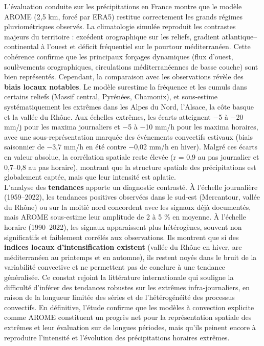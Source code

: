 \documentclass[
  article,
  nofooter,
  noheadings]{jss}
\begin{document}
L'évaluation conduite sur les précipitations en France montre que le
modèle AROME (2,5 km, forcé par ERA5) restitue correctement les grands
régimes pluviométriques observés. La climatologie simulée reproduit les
contrastes majeurs du territoire : excédent orographique sur les
reliefs, gradient atlantique--continental à l'ouest et déficit
fréquentiel sur le pourtour méditerranéen. Cette cohérence confirme que
les principaux forçages dynamiques (flux d'ouest, soulèvements
orographiques, circulations méditerranéennes de basse couche) sont bien
représentés. Cependant, la comparaison avec les observations révèle des
\textbf{biais locaux notables}. Le modèle surestime la fréquence et les
cumuls dans certains reliefs (Massif central, Pyrénées, Chamonix), et
sous-estime systématiquement les extrêmes dans les Alpes du Nord,
l'Alsace, la côte basque et la vallée du Rhône. Aux échelles extrêmes,
les écarts atteignent −5 à −20 mm/j pour les maxima journaliers et −5 à
−10 mm/h pour les maxima horaires, avec une sous-représentation marquée
des événements convectifs estivaux (biais saisonnier de −3,7 mm/h en été
contre −0,02 mm/h en hiver). Malgré ces écarts en valeur absolue, la
corrélation spatiale reste élevée (r = 0,9 au pas journalier et 0,7--0,8
au pas horaire), montrant que la structure spatiale des précipitations
est globalement captée, mais que leur intensité est aplatie.\\

L'analyse des \textbf{tendances} apporte un diagnostic contrasté. À
l'échelle journalière (1959--2022), les tendances positives observées
dans le sud-est (Mercantour, vallée du Rhône) ou sur la moitié nord
concordent avec les signaux déjà documentés, mais AROME sous-estime leur
amplitude de 2 à 5 \% en moyenne. À l'échelle horaire (1990--2022), les
signaux apparaissent plus hétérogènes, souvent non significatifs et
faiblement corrélés aux observations. Ils montrent que si des
\textbf{indices locaux d'intensification existent} (vallée du Rhône en
hiver, arc méditerranéen au printemps et en automne), ils restent noyés
dans le bruit de la variabilité convective et ne permettent pas de
conclure à une tendance généralisée. Ce constat rejoint la littérature
internationale qui souligne la difficulté d'inférer des tendances
robustes sur les extrêmes infra-journaliers, en raison de la longueur
limitée des séries et de l'hétérogénéité des processus convectifs. En
définitive, l'étude confirme que les modèles à convection explicite
comme AROME constituent un progrès net pour la représentation spatiale
des extrêmes et leur évaluation sur de longues périodes, mais qu'ils
peinent encore à reproduire l'intensité et l'évolution des
précipitations horaires extrêmes.
\end{document}
